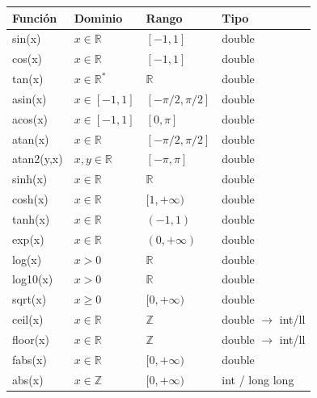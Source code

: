 \begin{longtable}{>{\ttfamily}l l l l}
\toprule
Función & Dominio & Rango & Tipo \\
\midrule
\endhead

sin(x)      & $x\in\mathbb{R}$            & $[-1,1]$                 & double \\
cos(x)      & $x\in\mathbb{R}$            & $[-1,1]$                 & double \\
tan(x)      & $x\in\mathbb{R}^\ast$       & $\mathbb{R}$             & double \\

asin(x)     & $x\in[-1,1]$               & $[-\pi/2,\pi/2]$         & double \\
acos(x)     & $x\in[-1,1]$               & $[0,\pi]$                & double \\
atan(x)     & $x\in\mathbb{R}$            & $[-\pi/2,\pi/2]$         & double \\
atan2(y,x)  & $x,y\in\mathbb{R}$          & $[-\pi,\pi]$             & double \\

sinh(x)     & $x\in\mathbb{R}$            & $\mathbb{R}$             & double \\
cosh(x)     & $x\in\mathbb{R}$            & $[1,+\infty)$            & double \\
tanh(x)     & $x\in\mathbb{R}$            & $(-1,1)$                & double \\

exp(x)      & $x\in\mathbb{R}$            & $(0,+\infty)$            & double \\

log(x)      & $x>0$                       & $\mathbb{R}$             & double \\
log10(x)    & $x>0$                       & $\mathbb{R}$             & double \\

sqrt(x)     & $x\ge0$                     & $[0,+\infty)$            & double \\

ceil(x)     & $x\in\mathbb{R}$            & $\mathbb{Z}$             & double $\rightarrow$ int/ll \\
floor(x)    & $x\in\mathbb{R}$            & $\mathbb{Z}$             & double $\rightarrow$ int/ll \\

fabs(x)     & $x\in\mathbb{R}$            & $[0,+\infty)$            & double \\
abs(x)      & $x\in\mathbb{Z}$            & $[0,+\infty)$            & int / long long \\

\bottomrule
\end{longtable}